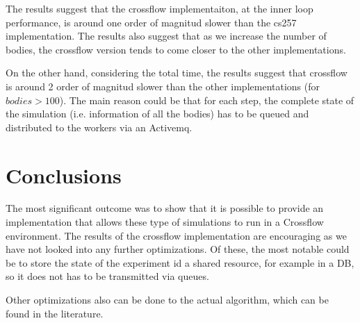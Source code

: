 \documentclass[11pt,a4paper]{article}
\begin{document}
The results suggest that the crossflow implementaiton, at the inner loop performance, is around one order of magnitud slower than the cs257 implementation.
The results also suggest that as we increase the number of bodies, the crossflow version tends to come closer to the other implementations.

On the other hand, considering the total time, the results suggest that crossflow is around 2 order of magnitud slower than the other implementations (for $bodies > 100$).
The main reason could be that for each step, the complete state of the simulation (i.e. information of all the bodies) has to be queued and distributed to the workers via an Activemq.

 
\section{Conclusions}
The most significant outcome was to show that it is possible to provide an implementation that allows these type of simulations to run in a Crossflow environment.
The results of the crossflow implementation are encouraging as we have not looked into any further optimizations.
Of these, the most notable could be to store the state of the experiment id a shared resource, for example in a DB, so it does not has to be transmitted via queues.

Other optimizations also can be done to the actual algorithm, which can be found in the literature.

    
\end{document}
